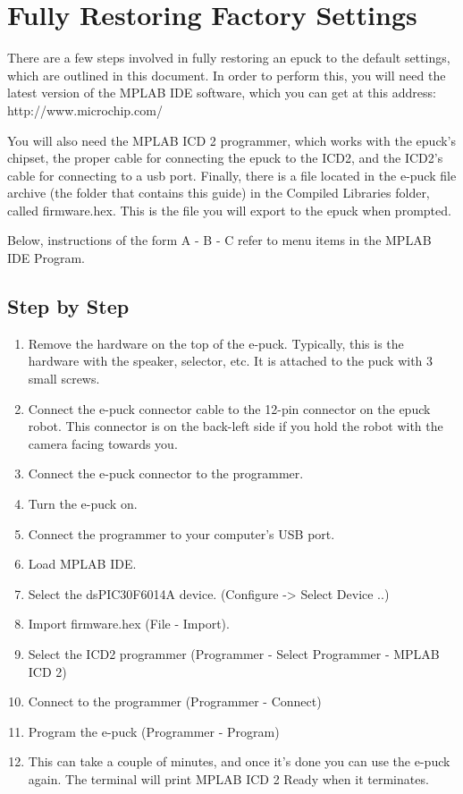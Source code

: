 \documentclass[11pt]{article} %
\begin{document}
\section{Fully Restoring Factory Settings}

There are a few steps involved in fully restoring an epuck to the default settings, which are outlined in this document.  In order to perform this, you will need the latest version of the MPLAB IDE software, which you can get at this address: http://www.microchip.com/

You will also need the MPLAB ICD 2 programmer, which works with the epuck's chipset, the proper cable for connecting the epuck to the ICD2, and the ICD2's cable for connecting to a usb port.  Finally, there is a file located in the e-puck file archive (the folder that contains this guide) in the Compiled Libraries folder, called firmware.hex.  This is the file you will export to the epuck when prompted.

Below, instructions of the form A - B - C refer to menu items in the MPLAB IDE Program.

\subsection{Step by Step}

\begin{enumerate}

	\item Remove the hardware on the top of the e-puck.  Typically, this is the hardware with the speaker, selector, etc.  It is attached to the puck with 3 small screws.
	\item Connect the e-puck connector cable to the 12-pin connector on the epuck robot.  This connector is on the back-left side if you hold the robot with the camera facing towards you.
	\item Connect the e-puck connector to the programmer.
	\item Turn the e-puck on.
	\item Connect the programmer to your computer's USB port.
	\item Load MPLAB IDE.
	\item Select the dsPIC30F6014A device. (Configure -> Select Device ..)
	\item Import firmware.hex (File - Import).
	\item Select the ICD2 programmer (Programmer - Select Programmer - MPLAB ICD 2)
	\item Connect to the programmer (Programmer - Connect)
	\item Program the e-puck (Programmer - Program)
	\item This can take a couple of minutes, and once it's done you can use the e-puck again.  The terminal will print MPLAB ICD 2 Ready when it terminates.

\end{enumerate}
\end{document}
